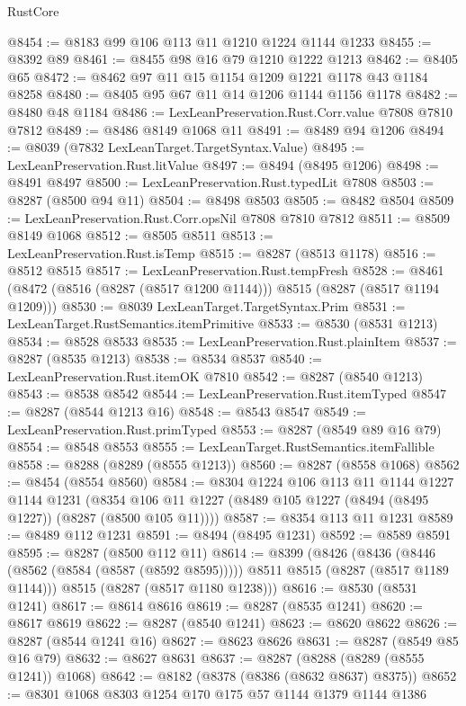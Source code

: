 \begin{lexlean}{RustCore}
\begin{coremodule}
@8454 := @8183 @99 @106 @113 @11 @1210 @1224 @1144 @1233
@8455 := @8392 @89
@8461 := @8455 @98 @16 @79 @1210 @1222 @1213
@8462 := @8405 @65
@8472 := @8462 @97 @11 @15 @1154 @1209 @1221 @1178 @43 @1184 @8258
@8480 := @8405 @95 @67 @11 @14 @1206 @1144 @1156 @1178
@8482 := @8480 @48 @1184
@8486 := LexLeanPreservation.Rust.Corr.value @7808 @7810 @7812
@8489 := @8486 @8149 @1068 @11
@8491 := @8489 @94 @1206
@8494 := @8039 (@7832 LexLeanTarget.TargetSyntax.Value)
@8495 := LexLeanPreservation.Rust.litValue
@8497 := @8494 (@8495 @1206)
@8498 := @8491 @8497
@8500 := LexLeanPreservation.Rust.typedLit @7808
@8503 := @8287 (@8500 @94 @11)
@8504 := @8498 @8503
@8505 := @8482 @8504
@8509 := LexLeanPreservation.Rust.Corr.opsNil @7808 @7810 @7812
@8511 := @8509 @8149 @1068
@8512 := @8505 @8511
@8513 := LexLeanPreservation.Rust.isTemp
@8515 := @8287 (@8513 @1178)
@8516 := @8512 @8515
@8517 := LexLeanPreservation.Rust.tempFresh
@8528 := @8461 (@8472 (@8516 (@8287 (@8517 @1200 @1144))) @8515 (@8287 (@8517 @1194 @1209)))
@8530 := @8039 LexLeanTarget.TargetSyntax.Prim
@8531 := LexLeanTarget.RustSemantics.itemPrimitive
@8533 := @8530 (@8531 @1213)
@8534 := @8528 @8533
@8535 := LexLeanPreservation.Rust.plainItem
@8537 := @8287 (@8535 @1213)
@8538 := @8534 @8537
@8540 := LexLeanPreservation.Rust.itemOK @7810
@8542 := @8287 (@8540 @1213)
@8543 := @8538 @8542
@8544 := LexLeanPreservation.Rust.itemTyped
@8547 := @8287 (@8544 @1213 @16)
@8548 := @8543 @8547
@8549 := LexLeanPreservation.Rust.primTyped
@8553 := @8287 (@8549 @89 @16 @79)
@8554 := @8548 @8553
@8555 := LexLeanTarget.RustSemantics.itemFallible
@8558 := @8288 (@8289 (@8555 @1213))
@8560 := @8287 (@8558 @1068)
@8562 := @8454 (@8554 @8560)
@8584 := @8304
    @1224
    @106
    @113
    @11
    @1144
    @1227
    @1144
    @1231
    (@8354 @106 @11 @1227 (@8489 @105 @1227 (@8494 (@8495 @1227)) (@8287 (@8500 @105 @11))))
@8587 := @8354 @113 @11 @1231
@8589 := @8489 @112 @1231
@8591 := @8494 (@8495 @1231)
@8592 := @8589 @8591
@8595 := @8287 (@8500 @112 @11)
@8614 := @8399
    (@8426
      (@8436 (@8446 (@8562 (@8584 (@8587 (@8592 @8595))))) @8511 @8515 (@8287 (@8517 @1189 @1144)))
      @8515
      (@8287 (@8517 @1180 @1238)))
@8616 := @8530 (@8531 @1241)
@8617 := @8614 @8616
@8619 := @8287 (@8535 @1241)
@8620 := @8617 @8619
@8622 := @8287 (@8540 @1241)
@8623 := @8620 @8622
@8626 := @8287 (@8544 @1241 @16)
@8627 := @8623 @8626
@8631 := @8287 (@8549 @85 @16 @79)
@8632 := @8627 @8631
@8637 := @8287 (@8288 (@8289 (@8555 @1241)) @1068)
@8642 := @8182 (@8378 (@8386 (@8632 @8637) @8375))
@8652 := @8301 @1068 @8303 @1254 @170 @175 @57 @1144 @1379 @1144 @1386

\end{coremodule}
\end{lexlean}
